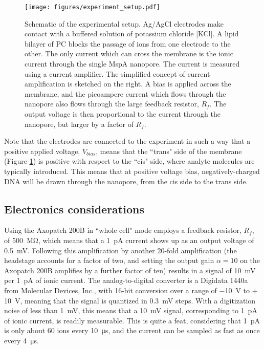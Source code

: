 \begin{figure}[h]
\begin{centering}
\texttt{[image: figures/experiment\_setup.pdf]}
\caption[Experimental setup]{Schematic of the experimental setup.  Ag/AgCl electrodes make contact with a buffered solution of potassium chloride [KCl].  A lipid bilayer of PC blocks the passage of ions from one electrode to the other.  The only current which can cross the membrane is the ionic current through the single MspA nanopore.  The current is measured using a current amplifier.  The simplified concept of current amplification is sketched on the right.  A bias is applied across the membrane, and the picoampere current which flows through the nanopore also flows through the large feedback resistor, $R_f$.  The output voltage is then proportional to the current through the nanopore, but larger by a factor of $R_f$.}
\label{fig:setup}
\end{centering}
\end{figure}

Note that the electrodes are connected to the experiment in such a way that a positive applied voltage, $V_{bias}$, means that the ``trans" side of the membrane (Figure \ref{fig:setup}) is positive with respect to the ``cis" side, where analyte molecules are typically introduced.  This means that at positive voltage bias, negatively-charged DNA will be drawn through the nanopore, from the cis side to the trans side.

\subsection{Electronics considerations}

Using the Axopatch 200B in ``whole cell" mode employs a feedback resistor, $R_f$, of \SI{500}{\mega\ohm}, which means that a \SI{1}{\pA} current shows up as an output voltage of \SI{0.5}{\mV}.  Following this amplification by another 20-fold amplification (the headstage accounts for a factor of two, and setting the output gain $\alpha=10$ on the Axopatch 200B amplifies by a further factor of ten) results in a signal of \SI{10}{\mV} per \SI{1}{\pico\ampere} of ionic current.  The analog-to-digital converter is a Digidata 1440a from Molecular Devices, Inc., with 16-bit conversion over a range of \SI{-10}{\volt} to $+$\SI{10}{\volt}, meaning that the signal is quantized in \SI{0.3}{\mV} steps.  With a digitization noise of less than \SI{1}{\mV}, this means that a \SI{10}{\milli\volt} signal, corresponding to \SI{1}{\pico\ampere} of ionic current, is readily measurable.  This is quite a feat, considering that \SI{1}{\pA} is only about \num{60} ions every \SI{10}{\us}, and the current can be sampled as fast as once every \SI{4}{\us}.


